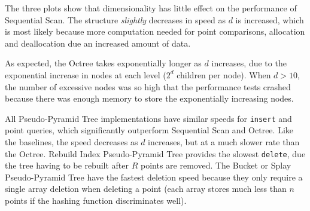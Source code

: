 The three plots show that dimensionality has little effect on the performance of Sequential Scan. The structure \textit{slightly} decreases in speed as $d$ is increased, which is most likely because more computation needed for point comparisons, allocation and deallocation due an increased amount of data.

As expected, the Octree takes exponentially longer as $d$ increases, due to the exponential increase in nodes at each level ($2^d$ children per node). When $d > 10$, the number of excessive nodes was so high that the performance tests crashed because there was enough memory to store the exponentially increasing nodes.

All Pseudo-Pyramid Tree implementations have similar speeds for \texttt{insert} and point queries, which significantly outperform Sequential Scan and Octree. Like the baselines, the speed decreases as $d$ increases, but at a much slower rate than the Octree. Rebuild Index Pseudo-Pyramid Tree provides the slowest \texttt{delete}, due the tree having to be rebuilt after $R$ points are removed. The Bucket or Splay Pseudo-Pyramid Tree have the fastest deletion speed because they only require a single array deletion when deleting a point (each array stores much less than $n$ points if the hashing function discriminates well).

